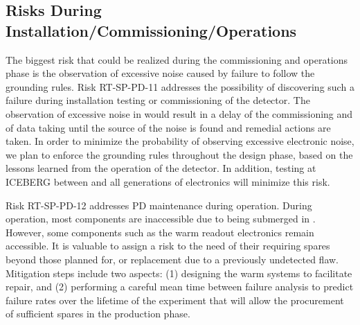 \subsection{Risks During Installation/Commissioning/Operations}

The biggest risk that could be realized during the commissioning and operations phase is
the observation of excessive noise caused by failure to follow the 
grounding rules.  Risk RT-SP-PD-11 addresses the possibility of discovering such a failure during installation  testing or commissioning of the detector.  The observation of excessive noise in 
would result in a delay of the commissioning and of data taking until the source of the noise is
found and remedial actions are taken. In order to minimize the probability of observing excessive
electronic noise, we plan to enforce the grounding rules throughout the design phase, based on
the lessons learned from the operation of the  detector.  In addition, testing at ICEBERG between  and all generations of  electronics will minimize this risk.  

Risk RT-SP-PD-12 addresses PD maintenance during operation.   During operation, most  components are inaccessible due to being submerged in .  However, some components such as the warm readout electronics remain accessible. It is valuable to assign a risk to the need of their requiring spares beyond those planned for, or replacement due to a previously undetected flaw.  %
Mitigation steps include two aspects: (1) designing the warm systems to facilitate repair, and (2) performing a careful mean time between failure analysis to predict failure rates over the lifetime of the experiment that will allow the procurement of sufficient spares in the production phase. 